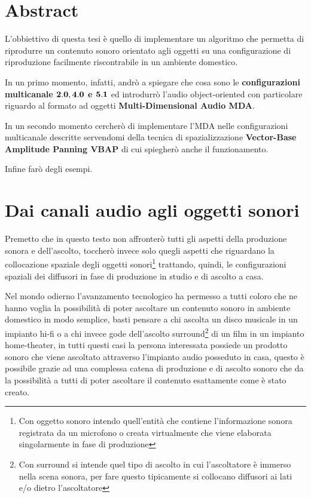 \documentclass[12pt,a4paper]{report}
\begin{document}
\tableofcontents

\listoffigures



\chapter*{Abstract}

L'obbiettivo di questa tesi è quello di implementare un algoritmo che permetta di riprodurre un contenuto sonoro orientato agli oggetti su una configurazione di riproduzione facilmente riscontrabile in un ambiente domestico.

In un primo momento, infatti, andrò a spiegare che cosa sono le \textbf{configurazioni multicanale $\bold{2.0, 4.0}$ e $\bold{5.1}$} ed introdurrò l'audio object-oriented con particolare riguardo al formato ad oggetti \textbf{Multi-Dimensional Audio MDA}.

In un secondo momento cercherò di implementare l'MDA nelle configurazioni multicanale descritte servendomi della tecnica di spazializzazione \textbf{Vector-Base Amplitude Panning VBAP} di cui spiegherò anche il funzionamento.

Infine farò degli esempi.


\chapter{Dai canali audio agli oggetti sonori}

Premetto che in questo testo non affronterò tutti gli aspetti della produzione sonora e dell'ascolto, toccherò invece solo quegli aspetti che riguardano la collocazione spaziale degli oggetti sonori\footnote{Con oggetto sonoro intendo quell'entità che contiene l'informazione sonora registrata da un microfono o creata virtualmente che viene elaborata singolarmente in fase di produzione} trattando, quindi, le configurazioni spaziali dei diffusori in fase di produzione in studio e di ascolto a casa.

Nel mondo odierno l'avanzamento tecnologico ha permesso a tutti coloro che ne hanno voglia la possibilità di poter ascoltare un contenuto sonoro in ambiente domestico in modo semplice, basti pensare a chi ascolta un disco musicale in un impianto hi-fi o a chi invece gode dell'ascolto surround\footnote{Con surround si intende quel tipo di ascolto in cui l'ascoltatore è immerso nella scena sonora, per fare questo tipicamente si collocano diffusori ai lati e/o dietro l'ascoltatore} di un film in un impianto home-theater, in tutti questi casi la persona interessata possiede un prodotto sonoro che viene ascoltato attraverso l'impianto audio posseduto in casa, questo è possibile grazie ad una complessa catena di produzione e di ascolto sonoro che da la possibilità a tutti di poter ascoltare il contenuto esattamente come è stato creato.
\end{document}
